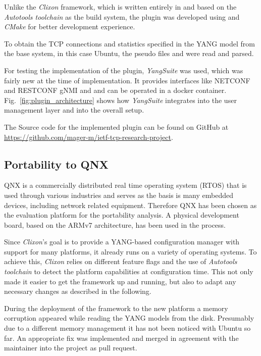 Unlike the \textit{Clixon} framework, which is written entirely in  and based on the \textit{Autotools toolchain} as the build system, the plugin was developed using  and \textit{CMake} for better development experience.

To obtain the TCP connections and statistics specified in the YANG model from the base system, in this case Ubuntu, the pseudo files  and  were read and parsed.

For testing the implementation of the plugin, \textit{YangSuite} was used, which was fairly new at the time of implementation. It provides interfaces like NETCONF and RESTCONF gNMI and and can be operated in a docker container. Fig.~\ref{fig:plugin_architecture} shows how \textit{YangSuite} integrates into the user management layer and into the overall setup.

The Source code for the implemented plugin can be found on GitHub at \url{https://github.com/mager-m/ietf-tcp-research-project}.

\subsection{Portability to QNX}
\label{Portability to QNX}

QNX is a commercially distributed real time operating system (RTOS) that is used through various industries and serves as the basis is many embedded devices, including network related equipment. Therefore QNX has been chosen as the evaluation platform for the portability analysis. A physical development board, based on the ARMv7 architecture, has been used in the process.

Since \textit{Clixon}'s goal is to provide a YANG-based configuration manager with support for many platforms, it already runs on a variety of operating systems. To achieve this, \textit{Clixon} relies on different feature flags and the use of \textit{Autotools toolchain} to detect the platform capabilities at configuration time. This not only made it easier to get the framework up and running, but also to adapt any necessary changes as described in the following. 

During the deployment of the framework to the new platform a memory corruption appeared while reading the YANG models from the disk. Presumably due to a different memory management it has not been noticed with Ubuntu so far. An appropriate fix was implemented and merged in agreement with the maintainer into the project as pull request.

